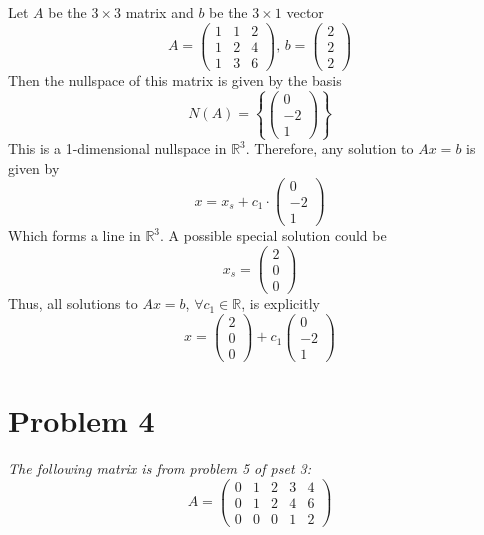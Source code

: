 \documentclass{article}
\begin{document}
Let $ A $ be the $ 3 \times 3 $ matrix and $ b $ be the $3 \times 1$ vector
$$ A = \begin{pmatrix}
    1 & 1 & 2 \\
    1 & 2 & 4 \\
    1 & 3 & 6
\end{pmatrix},\, b = \begin{pmatrix}
    2 \\
    2 \\
    2
\end{pmatrix} $$
Then the nullspace of this matrix is given by the basis
$$ N(A) = \left\{ \begin{pmatrix}
    0 \\
    -2 \\
    1
\end{pmatrix} \right\} $$
This is a 1-dimensional nullspace in $ \mathbb{R}^3 $. Therefore, any
solution to $ Ax = b $ is given by
$$ x = x_s + c_1 \cdot \begin{pmatrix}
    0 \\
    -2 \\
    1
\end{pmatrix} $$
Which forms a line in $ \mathbb{R}^3 $. A possible special solution could be
$$ x_s = \begin{pmatrix}
    2 \\
    0 \\
    0
\end{pmatrix} $$
Thus, all solutions to $ Ax = b $, $ \forall c_1 \in \mathbb{R} $, is
explicitly
$$ x = \begin{pmatrix}
    2 \\
    0 \\
    0
\end{pmatrix} + c_1 \begin{pmatrix}
    0 \\
    -2 \\
    1
\end{pmatrix} $$

\section*{Problem 4}

\textit{The following matrix is from problem 5 of pset 3:}
$$ A = \begin{pmatrix}
    0 & 1 & 2 & 3 & 4 \\
    0 & 1 & 2 & 4 & 6 \\
    0 & 0 & 0 & 1 & 2
\end{pmatrix} $$
\end{document}
